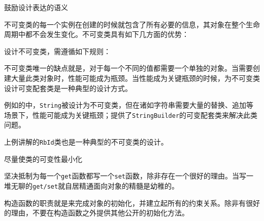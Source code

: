 \begin{content}

\begin{advise}
鼓励设计表达的语义
\end{advise}

不可变类的每一个实例在创建的时候就包含了所有必要的信息，其对象在整个生命周期中都不会发生变化。不可变类具有如下几方面的优势：
\begin{enum}
\end{enum}

设计不可变类，需遵循如下规则：
\begin{enum}
\end{enum}

不可变类唯一的缺点就是，对于每一个不同的值都需要一个单独的对象。当需要创建大量此类对象时，性能可能成为瓶颈。当性能成为关键瓶颈的时候，为不可变类设计可变配套类是一种典型的设计方式。

例如的中，\texttt{String}被设计为不可变类，但在诸如字符串需要大量的替换、追加等场景下，性能可能成为关键瓶颈；提供了\texttt{StringBuilder}的可变配套类来解决此类问题。

上例讲解的\texttt{RbId}类也是一种典型的不可变类的设计。

\begin{advise}
尽量使类的可变性最小化
\end{advise}

坚决抵制为每一个\texttt{get}函数都写一个\texttt{set}函数，除非存在一个很好的理由。当写一堆无聊的\texttt{get/set}就自居精通面向对象的精髓是幼稚的。

构造函数的职责就是来完成对象的初始化，并建立起所有的约束关系。除非有很好的理由，不要在构造函数之外提供其他公开的初始化方法。

\end{content}

